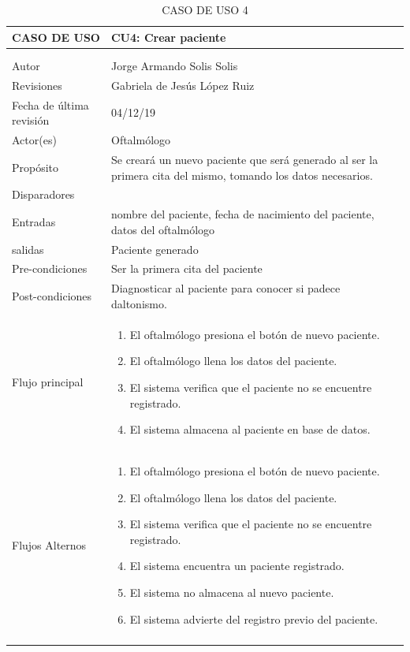 \documentclass[10pt]{article}
\begin{document}
\begin{longtable}{|p{3.8cm}|p{10.8cm}|}
\hline
CASO DE USO & CU4: Crear paciente\\
\hline 
\endfirsthead

\hline

 & \\
\hline 
\endhead

\multicolumn{2}{c}{}
\endfoot

\endlastfoot
\hline
versión & 1\\
\hline
Autor & Jorge Armando Solis Solis\\
\hline
Revisiones & Gabriela de Jesús López Ruiz \\
\hline
Fecha de última revisión & 04/12/19\\
\hline
Actor(es) & Oftalmólogo \\
\hline
Propósito & Se creará un nuevo paciente que será generado al ser la primera cita del mismo, tomando los datos necesarios.\\
\hline
Disparadores & \\
\hline
Entradas & nombre del paciente, fecha de nacimiento del paciente, datos del oftalmólogo\\
\hline
salidas & Paciente generado\\
\hline
Pre-condiciones & Ser la primera cita del paciente \\
\hline
Post-condiciones & Diagnosticar al paciente para conocer si padece daltonismo. \\
\hline
Flujo principal & \begin{enumerate}
    \item El oftalmólogo presiona el botón de nuevo paciente.
    \item El oftalmólogo llena los datos del paciente.
    \item El sistema verifica que el paciente no se encuentre registrado.
    \item El sistema almacena al paciente en base de datos.
\end{enumerate}
    \\
\hline
Flujos Alternos & \begin{enumerate}
    \item El oftalmólogo presiona el botón de nuevo paciente.
    \item El oftalmólogo llena los datos del paciente.
    \item El sistema verifica que el paciente no se encuentre registrado.
    \item El sistema encuentra un paciente registrado.
    \item El sistema no almacena al nuevo paciente.
    \item El sistema advierte del registro previo del paciente.
\end{enumerate}\\
\hline
\caption{CASO DE USO 4}
\label{tabla1}
\end{longtable}
\end{document}
